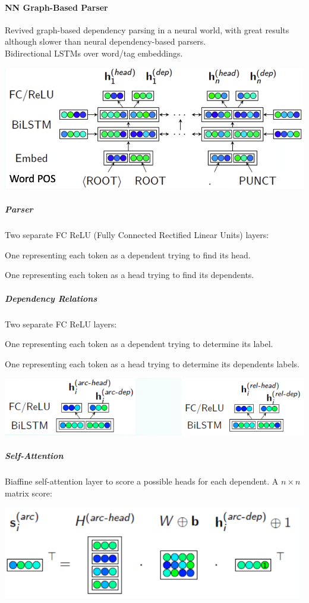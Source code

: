 \documentclass[10pt]{report}
\begin{document}
\paragraph{NN Graph-Based Parser} Revived graph-based dependency parsing in a neural world, with great results although slower than neural dependency-based parsers.\\
Bidirectional LSTMs over word/tag embeddings.
\begin{center}
	\includegraphics[scale=0.5]{38.png}
\end{center}
\subparagraph{Parser} Two separate FC ReLU (Fully Connected Rectified Linear Units) layers:
\begin{list}{}{}
	\item One representing each token as a dependent trying to find its head.
	\item One representing each token as a head trying to find its dependents.
\end{list}
\subparagraph{Dependency Relations} Two separate FC ReLU layers:\begin{list}{}{}
	\item One representing each token as a dependent trying to determine its label.
	\item One representing each token as a head trying to determine its dependents labels.
\end{list}
\begin{center}
	\includegraphics[scale=0.5]{46.png}
\end{center}
\subparagraph{Self-Attention} Biaffine self-attention layer to score a possible heads for each dependent.
A $n\times n$ matrix score:
\begin{center}
	\includegraphics[scale=0.5]{47.png}
\end{center}
\end{document}
